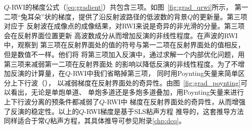 $Q$-RWI的梯度公式（\ref{eq:gradient}）共包含三项。如图~\ref{fig:grad_qrwi}所示，
第一二项“兔耳朵”状的梯度，提供了沿反射波路径的低波数的背景$Q$的更新量。第三项对应于
反射波在成像点的成像结果，对RWI来说是奇异的非光滑的分量。第三项会在反射界面位置更新
高波数成分从而增加反演的非线性程度。在声波的RWI中，观察到
第三项在反射界面处的值的符号与第一二项在反射界面处的值相反，但是数值不一样。他们将
将第三项加入反演中，通过求解一个内部优化问题，用第三项来减弱第一二项在反射界面处
的影响以降低反演的非线性程度。为了不增加反演的计算量，在$Q$-RWI中我们省略掉第三项，
同时用Poynting矢量来简单区分上下行波（），
以减弱梯度在反射界面处的奇异性。由图~\ref{fig:grad_poynting}可以看出，无论是单炮单道、
单炮多道还是多炮多道叠加，用Poynting矢量来进行上下行波分离的预条件都减弱了$Q$-RWI中
梯度在反射界面处的奇异性，从而增强了反演的稳定性。以上的$Q$-RWI梯度是基于SLS粘声方程
推导的，这套推导方法同样适合于常$Q$粘声方程，其具体推导可参见附录\ref{chp:dcq}。

